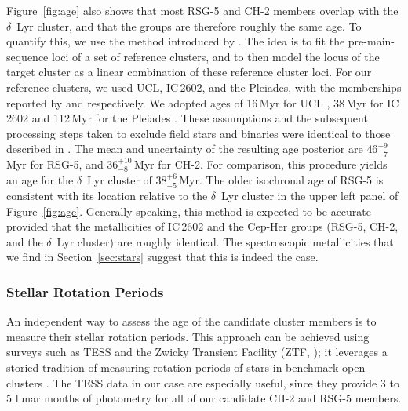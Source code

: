 \documentclass[12pt,twocolumn,tighten,linenumbers,trackchanges]{aastex63}
\begin{document}
Figure~\ref{fig:age} also shows that most RSG-5 and CH-2 members
overlap with the $\delta$~Lyr cluster, and that the groups are
therefore roughly the same age.  To quantify this, we use the method
introduced by \citet[][their Section~6.3]{gagne_mutau_2020}.  The idea
is to fit the pre-main-sequence loci of a set of reference clusters,
and to then model the locus of the target cluster as a linear
combination of these reference cluster loci.  For our reference
clusters, we used UCL, IC\,2602, and the Pleiades, with the
memberships reported by \citet{Damiani2019} and
\cite{CantatGaudin2018a} respectively.  We adopted ages of 16\,Myr for
UCL \citep{pecaut_star_2016}, 38\,Myr for IC\,2602
\citep{david_ages_2015,randich_gaiaeso_2018} and 112\,Myr for the
Pleiades \citep{dahm_2015}.  These assumptions and the subsequent
processing steps taken to exclude field stars and binaries were
identical to those described in \citet{bouma_kep1627_2022}.  The mean
and uncertainty of the resulting age posterior are $46^{+9}_{-7}$\,Myr
for RSG-5, and $36^{+10}_{-8}$\,Myr for CH-2.  For comparison, this
procedure yields an age for the $\delta$~Lyr cluster of
$38^{+6}_{-5}$\,Myr.  The older isochronal age of RSG-5 is consistent
with its location relative to the $\delta$~Lyr cluster in the upper
left panel of Figure~\ref{fig:age}.
Generally speaking, this method is expected to be accurate provided
that the metallicities of IC\,2602 and the Cep-Her groups (RSG-5,
CH-2, and the $\delta$~Lyr cluster) are roughly identical.  The
spectroscopic metallicities that we find in Section~\ref{sec:stars}
suggest that this is indeed the case.


\subsubsection{Stellar Rotation Periods}
\label{sec:rotation}

An independent way to assess the age of the candidate cluster members
is to measure their stellar rotation periods.  This approach can be
achieved using surveys such as TESS \citep{ricker_transiting_2015} and
the Zwicky Transient Facility (ZTF, \citealt{bellm_zwicky_2019}); it
leverages a storied tradition of measuring rotation periods of stars
in benchmark open clusters \citep[see
{e.g.},][]{skumanich_time_1972,curtis_rup147_2020}.  The TESS data in
our case are especially useful, since they provide 3 to 5 lunar months
of photometry for all of our candidate CH-2 and RSG-5 members.
\end{document}
